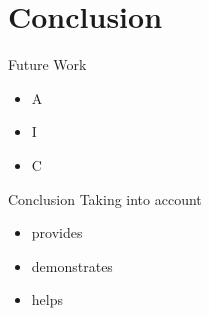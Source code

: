 \documentclass[handout]{beamer}
\begin{document}




\section{Conclusion}

\begin{frame}{Future Work}
\pause
\begin{itemize}[<+->]
	\item A
	\item I
	\item C
\end{itemize}

\end{frame}


\begin{frame}{Conclusion}
Taking into account
\pause
\begin{itemize}[<+->]
		\item provides 
		\item demonstrates 
		\item helps 
\end{itemize}

\end{frame}
\end{document}
